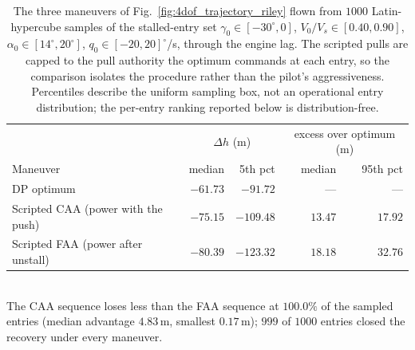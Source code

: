 \begin{table}[H]
    \centering
    \caption{The three maneuvers of Fig.~\ref{fig:4dof_trajectory_riley}
    flown from $1000$ Latin-hypercube samples of the stalled-entry set
    $\gamma_0 \in [-30^\circ, 0]$, $V_0/V_s \in [0.40, 0.90]$,
    $\alpha_0 \in [14^\circ, 20^\circ]$, $q_0 \in [-20, 20]^\circ$/s,
    through the engine lag. The scripted pulls are capped to the pull
    authority the optimum commands at each entry, so the comparison
    isolates the procedure rather than the pilot's aggressiveness.
    Percentiles describe the uniform sampling box, not an operational
    entry distribution; the per-entry ranking reported below is
    distribution-free.}
    \label{tab:montecarlo_scripted}
    \setlength{\tabcolsep}{14pt}\renewcommand{\arraystretch}{1.15}
    \begin{tabular}{lrrrr}
        \hline
        & \multicolumn{2}{c}{$\Delta h$ (m)} & \multicolumn{2}{c}{excess over optimum (m)} \\
        Maneuver & median & 5th pct & median & 95th pct \\
        \hline
        DP optimum & $-61.73$ & $-91.72$ & --- & --- \\
        Scripted CAA (power with the push) & $-75.15$ & $-109.48$ & $13.47$ & $17.92$ \\
        Scripted FAA (power after unstall) & $-80.39$ & $-123.32$ & $18.18$ & $32.76$ \\
        \hline
    \end{tabular}
    \\[2pt]
    \footnotesize The CAA sequence loses less than the FAA sequence at $100.0\%$ of the sampled entries (median advantage $4.83$\,m, smallest $0.17$\,m); $999$ of $1000$ entries closed the recovery under every maneuver.
\end{table}
